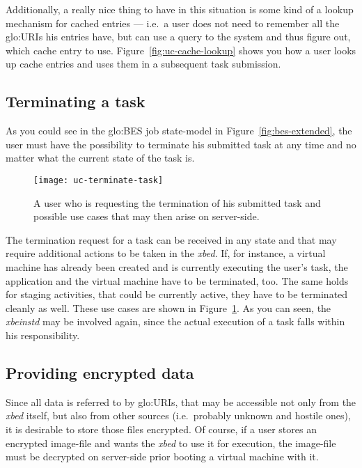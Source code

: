 Additionally, a really  nice thing to have in this  situation is some kind
of a lookup mechanism for cached  entries --- i.e.~a user does not need to
remember all the  \gls{glo:URI}s his entries have, but can  use a query to
the    system   and   thus    figure   out,    which   cache    entry   to
use. Figure~\ref{fig:uc-cache-lookup} shows you  how a user looks up cache
entries and uses them in a subsequent task submission.

\subsection{Terminating a task}
\label{sec:uc-terminate-task}

As   you   could   see   in   the   \gls{glo:BES}   job   state-model   in
Figure~\ref{fig:bes-extended},  the  user  must  have the  possibility  to
terminate his  submitted task at any  time and no matter  what the current
state of the task is.

\begin{figure}[h!]
  \centering
  \texttt{[image: uc-terminate-task]}
  \caption[UC Terminate Task]{A user  who is requesting the termination of
    his  submitted task  and possible  use cases  that may  then  arise on
    server-side.}
  \label{fig:uc-terminate-task}
\end{figure}

The termination request  for a task can be received in  any state and that
may require  additional actions to be  taken in the  \emph{xbed}.  If, for
instance,  a virtual  machine has  already been  created and  is currently
executing the user's task, the application and the virtual machine have to
be terminated, too.  The same  holds for staging activities, that could be
currently active, they  have to be terminated cleanly  as well.  These use
cases are  shown in  Figure~\ref{fig:uc-terminate-task}. As you  can seen,
the \emph{xbeinstd} may be involved again, since the actual execution of a
task falls within his responsibility.

\subsection{Providing encrypted data}
\label{sec:uc-ecrypted-data}

Since all  data is referred to  by \gls{glo:URI}s, that  may be accessible
not  only  from  the  \emph{xbed}  itself, but  also  from  other  sources
(i.e.~probably unknown and  hostile ones), it is desirable  to store those
files encrypted. Of  course, if a user stores  an encrypted image-file and
wants  the \emph{xbed} to  use it  for execution,  the image-file  must be
decrypted on server-side prior booting a virtual machine with it.

